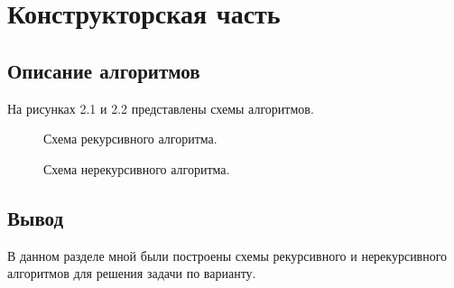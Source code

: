 \chapter{Конструкторская часть}

\section{Описание алгоритмов}

На рисунках 2.1 и 2.2 представлены схемы алгоритмов.

\begin{figure}[!htbp]
	\centering
	
	\caption{Схема рекурсивного алгоритма.}
\end{figure}

\begin{figure}[!htbp]
	\centering
	
	\caption{Схема нерекурсивного алгоритма.}
\end{figure}

\FloatBarrier

\section*{Вывод}

В данном разделе мной были построены схемы рекурсивного и нерекурсивного алгоритмов для решения задачи по варианту.

\clearpage
